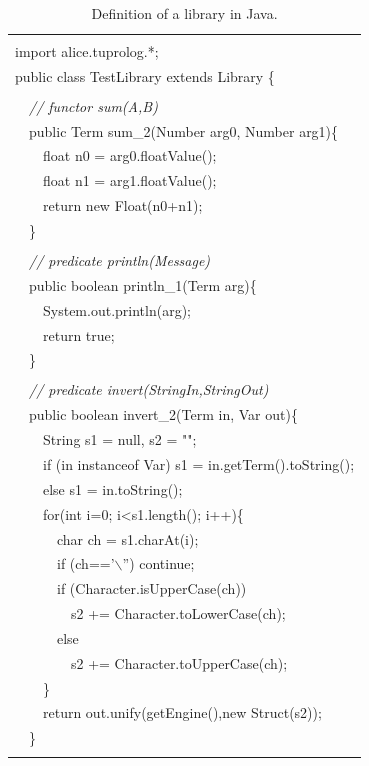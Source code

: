 \begin{table}
    \begin{center}{\small\tt
    \begin{tabular}{p{12cm}}
     \hline\\
    import alice.tuprolog.*;\\
    public class TestLibrary extends Library \{\\
    \\
    ~~\textit{// functor sum(A,B)}\\
    ~~public Term sum\_2(Number arg0, Number arg1)\{\\
    ~~~~float  n0 = arg0.floatValue();\\
    ~~~~float  n1 = arg1.floatValue();\\
    ~~~~return new Float(n0+n1);\\
    ~~\}\\
    \\
    ~~\textit{// predicate println(Message)}\\
    ~~public boolean println\_1(Term arg)\{\\
    ~~~~System.out.println(arg);\\
    ~~~~return true;\\
    ~~\}\\
    \\
    ~~\textit{// predicate invert(StringIn,StringOut)}\\
    ~~public boolean invert\_2(Term in, Var out)\{\\
    ~~~~String s1 = null, s2 = "";\\
	~~~~if (in instanceof Var) s1 = in.getTerm().toString();\\
	~~~~else s1 = in.toString();\\
	~~~~for(int i=0; i<s1.length(); i++)\{\\
	~~~~~~char ch = s1.charAt(i);\\
	~~~~~~if (ch=='$\backslash$'') continue;\\
	~~~~~~if (Character.isUpperCase(ch))\\
	~~~~~~~~s2 += Character.toLowerCase(ch);\\
	~~~~~~else\\
	~~~~~~~~s2 += Character.toUpperCase(ch);\\
	~~~~\}\\
	~~~~return out.unify(getEngine(),new Struct(s2));\\
    ~~\}\\
    \\\hline
    \end{tabular}
    }\end{center}
    \caption{Definition of a \tuprolog{} library in Java.}
    \label{tab:TestLibrary}
\end{table}

